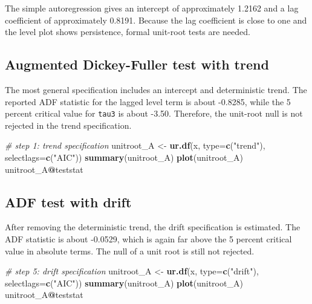 \documentclass[
  11pt,
]{article}
\newenvironment{Shaded}{\begin{snugshade}}{\end{snugshade}}
\newcommand{\AttributeTok}[1]{\textcolor[rgb]{0.13,0.29,0.53}{#1}}
\newcommand{\CommentTok}[1]{\textcolor[rgb]{0.56,0.35,0.01}{\textit{#1}}}
\newcommand{\FunctionTok}[1]{\textcolor[rgb]{0.13,0.29,0.53}{\textbf{#1}}}
\newcommand{\NormalTok}[1]{#1}
\newcommand{\OtherTok}[1]{\textcolor[rgb]{0.56,0.35,0.01}{#1}}
\newcommand{\SpecialCharTok}[1]{\textcolor[rgb]{0.81,0.36,0.00}{\textbf{#1}}}
\newcommand{\StringTok}[1]{\textcolor[rgb]{0.31,0.60,0.02}{#1}}
\begin{document}
The simple autoregression gives an intercept of approximately 1.2162 and
a lag coefficient of approximately 0.8191. Because the lag coefficient
is close to one and the level plot shows persistence, formal unit-root
tests are needed.

\subsection{Augmented Dickey-Fuller test with
trend}\label{augmented-dickey-fuller-test-with-trend}

The most general specification includes an intercept and deterministic
trend. The reported ADF statistic for the lagged level term is about
-0.8285, while the 5 percent critical value for \texttt{tau3} is about
-3.50. Therefore, the unit-root null is not rejected in the trend
specification.

\begin{Shaded}
\begin{Highlighting}[]
\CommentTok{\# step 1: trend specification}
\NormalTok{unitroot\_A }\OtherTok{\textless{}{-}} \FunctionTok{ur.df}\NormalTok{(x, }\AttributeTok{type=}\FunctionTok{c}\NormalTok{(}\StringTok{"trend"}\NormalTok{), }\AttributeTok{selectlags=}\FunctionTok{c}\NormalTok{(}\StringTok{"AIC"}\NormalTok{))}
\FunctionTok{summary}\NormalTok{(unitroot\_A)}
\FunctionTok{plot}\NormalTok{(unitroot\_A)}
\NormalTok{unitroot\_A}\SpecialCharTok{@}\NormalTok{teststat}
\end{Highlighting}
\end{Shaded}

\subsection{ADF test with drift}\label{adf-test-with-drift}

After removing the deterministic trend, the drift specification is
estimated. The ADF statistic is about -0.0529, which is again far above
the 5 percent critical value in absolute terms. The null of a unit root
is still not rejected.

\begin{Shaded}
\begin{Highlighting}[]
\CommentTok{\# step 5: drift specification}
\NormalTok{unitroot\_A }\OtherTok{\textless{}{-}} \FunctionTok{ur.df}\NormalTok{(x, }\AttributeTok{type=}\FunctionTok{c}\NormalTok{(}\StringTok{"drift"}\NormalTok{), }\AttributeTok{selectlags=}\FunctionTok{c}\NormalTok{(}\StringTok{"AIC"}\NormalTok{))}
\FunctionTok{summary}\NormalTok{(unitroot\_A)}
\FunctionTok{plot}\NormalTok{(unitroot\_A)}
\NormalTok{unitroot\_A}\SpecialCharTok{@}\NormalTok{teststat}
\end{Highlighting}
\end{Shaded}
\end{document}
